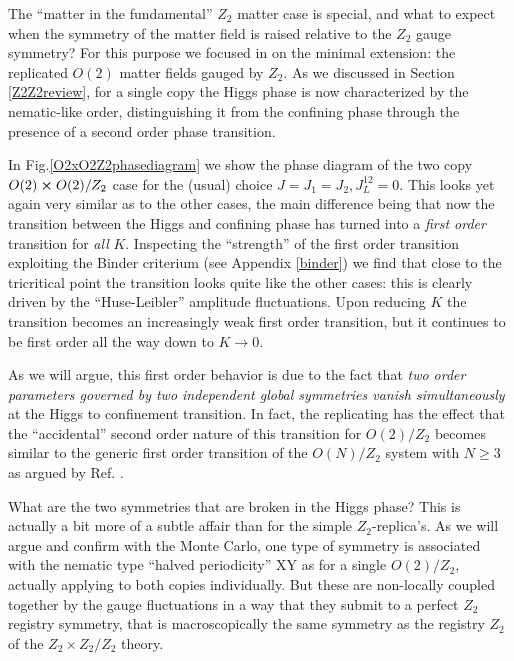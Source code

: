 The ``matter in the fundamental'' $Z_2$ matter case is special, and what to expect when the symmetry of the matter field is raised relative to the $Z_2$ gauge 
symmetry? For this purpose we focused in on the minimal extension: the replicated $O(2)$ matter fields gauged by $Z_2$. As we discussed in Section \ref{Z2Z2review}, for a single copy the Higgs phase is now characterized by the nematic-like order, distinguishing it from the confining phase through the presence of a second order phase transition.

In Fig.\ref{O2xO2Z2phasediagram}  we show the phase diagram of the two copy $O(2)\cross O(2)/Z_2$ case for the (usual) choice $J=J_1=J_2, J_L^{12} = 0$. This looks yet again very similar as to the other cases, the main difference being that now the transition between the Higgs and confining phase has turned into a {\em first order} transition for {\em all} $K$. Inspecting the ``strength'' of the first order transition exploiting the Binder criterium (see Appendix \ref{binder}) we find that close to the tricritical point the transition looks quite like the other cases: this is clearly driven by the ``Huse-Leibler'' amplitude fluctuations. Upon reducing $K$ the transition becomes an increasingly weak first order transition, but it continues to be first order all the way down to $K \rightarrow 0$.

As we will argue, this first order behavior is due to the fact that {\em two order parameters governed by two independent global symmetries vanish simultaneously}  at the Higgs to confinement transition. In fact, the replicating has the effect that the ``accidental'' second order nature of this transition for $O(2)/Z_2$ becomes similar to the generic first order transition of the $O(N)/Z_2$ system with $N \ge 3$ as argued by Ref. \cite{toner95}.

What are the two symmetries that are broken in the Higgs phase?  This is actually a bit more of a subtle affair than for the simple $Z_2$-replica's. As we will argue and confirm with the Monte Carlo, one type of symmetry is associated with the nematic type ``halved periodicity'' XY as for a single $O(2)/Z_2$, actually applying to both copies individually. But these are non-locally coupled together by the gauge fluctuations in a way that they submit to a perfect $Z_2$ registry symmetry, that is macroscopically the same symmetry as the registry $Z_2$ of the $Z_2\times Z_2/Z_2$ theory.        


